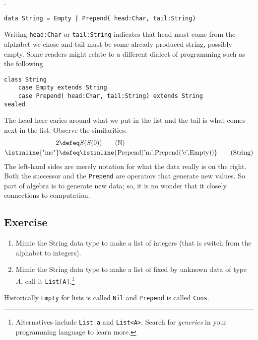 .
\begin{lstlisting}[language=Hidris]
data String = Empty | Prepend( head:Char, tail:String) 
\end{lstlisting}
Writing \lstinline{head:Char} or \lstinline{tail:String} 
indicates that head must come from the alphabet we chose 
and tail must be some already produced string, possibly empty.
Some readers might relate to a different dialect of 
programming such as the following
\begin{lstlisting}[language=Sava]
class String
    case Empty extends String
    case Prepend( head:Char, tail:String) extends String
sealed
\end{lstlisting}
The head here caries around what we put in the list and the tail 
is what comes next in the list.  Observe the similarities:
\begin{align}
     2 & \defeq S(S(0)) \tag{$\mathbb{N}$}\\
 \text{\lstinline{"me"}} & \defeq \text{\lstinline{Prepend('m',Prepend('e',Empty))}}
\tag{String}
\end{align}
The left-hand sides are merely notation for what the data really is on the right.
Both the successor and the \lstinline{Prepend} are operators that generate 
new values.  So part of algebra is to generate new data; so, it is no wonder 
that it closely connections to computation.

\subsection*{Exercise}
\begin{enumerate}
    \item Mimic the String data type to make a list of integers (that is 
    switch from the alphabet to integers).

    \item Mimic the String data type to make a list of fixed by 
    unknown data of type $A$, call it \lstinline{List[A]}.\footnote{
    Alternatives include \lstinline{List a} and \lstinline{List<A>}. 
    Search for \emph{generics} in your programming language to learn more.
    }

\end{enumerate}
Historically \lstinline{Empty} for lists is called \lstinline{Nil} 
and \lstinline{Prepend} is called \lstinline{Cons}.



